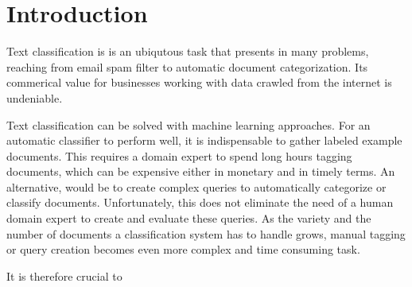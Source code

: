 
\chapter{Introduction}
\label{ch:Introduction}

Text classification is is an ubiqutous task that presents in many problems, reaching from email spam filter to automatic document categorization. Its commerical value for businesses working with data crawled from the internet is undeniable. 

Text classification can be solved with machine learning approaches. For an automatic classifier to perform well, it is indispensable to gather labeled example documents. This requires a domain expert to spend long hours tagging documents, which can be expensive either in monetary and in timely terms. 
An alternative, would be to create complex queries to automatically categorize or classify documents. Unfortunately, this does not eliminate the need of a human domain expert to create and evaluate these queries. 
As the variety and the number of documents a classification system has to handle grows, manual tagging or query creation becomes even more complex and time consuming task. 
 
It is therefore crucial to 